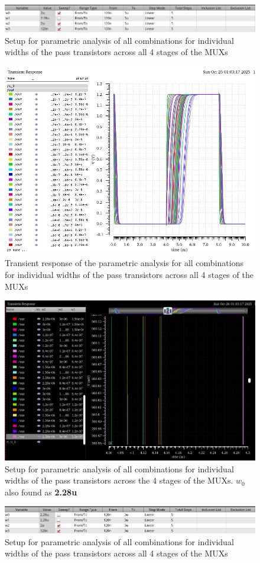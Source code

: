 \documentclass[12pt]{article}
\begin{document}
\begin{figure}[H]
    \centering
    \includegraphics[width=0.5\linewidth]{writeup//figures/wmux_3_parametric_sweep_setup.png}
    \caption{Setup for parametric analysis of all combinations for individual widths of the pass transistors across all 4 stages of the MUXs}
\end{figure}

\begin{figure}[H]
    \centering
    \includegraphics[width=0.5\linewidth]{writeup//figures/wmux_3_parametric_sweep.png}
    \caption{Transient response of the parametric analysis for all combinations for individual widths of the pass transistors across all 4 stages of the MUXs}
\end{figure}

\begin{figure}[H]
    \centering
    \includegraphics[width=0.8\linewidth]{writeup//figures/wmux_3_parametrics_weep.png}
    \caption{Setup for parametric analysis of all combinations for individual widths of the pass transistors across the 4 stages of the MUXs. $w_0$ also found as \textbf{2.28u}}
\end{figure}

\begin{figure}[H]
    \centering
    \includegraphics[width=0.5\linewidth]{writeup//figures/wmux_2_parametric_sweep_setup.png}
    \caption{Setup for parametric analysis of all combinations for individual widths of the pass transistors across all 4 stages of the MUXs}
\end{figure}
\end{document}
